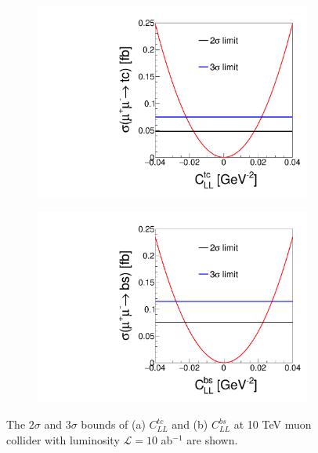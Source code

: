 \documentclass[a4paper,11pt]{article}
\begin{document}
\begin{figure}[htbp]
  \centering
  \captionsetup[sub]{font=large}
  \begin{subfigure}[t]{0.45\textwidth}
     \includegraphics[width=\linewidth]{clltc1d.pdf}
     \caption{}
     \label{fig:clltc1d}
  \end{subfigure}
  \begin{subfigure}[t]{0.45\textwidth}
     \includegraphics[width=\linewidth]{cllbs1d.pdf}
     \caption{}
     \label{fig:cllbs1d}
  \end{subfigure}
  \caption{The $2\sigma$ and $3\sigma$ bounds of (a) $C^{tc}_{LL}$ and (b) $C^{bs}_{LL}$ at 10 TeV muon collider with luminosity $\mathcal{L}=10$ ab$^{-1}$ are shown.}\label{fig:cll1d}
\end{figure}
\end{document}
